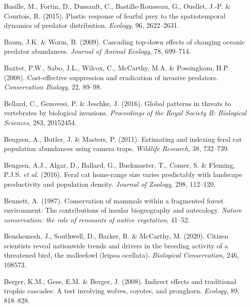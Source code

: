 \documentclass[11pt,a4paper,titlepage,twoside,openright]{style/unimelbthesis}
\begin{document}
\begin{mainmatter}
\leavevmode\hypertarget{ref-basille2015plastic}{}%
Basille, M., Fortin, D., Dussault, C., Bastille-Rousseau, G., Ouellet, J.-P. \& Courtois, R. (2015). Plastic response of fearful prey to the spatiotemporal dynamics of predator distribution. \emph{Ecology}, 96, 2622--2631.

\leavevmode\hypertarget{ref-baum2009cascading}{}%
Baum, J.K. \& Worm, B. (2009). Cascading top-down effects of changing oceanic predator abundances. \emph{Journal of Animal Ecology}, 78, 699--714.

\leavevmode\hypertarget{ref-baxter2008cost}{}%
Baxter, P.W., Sabo, J.L., Wilcox, C., McCarthy, M.A. \& Possingham, H.P. (2008). Cost-effective suppression and eradication of invasive predators. \emph{Conservation Biology}, 22, 89--98.

\leavevmode\hypertarget{ref-bellard2016global}{}%
Bellard, C., Genovesi, P. \& Jeschke, J. (2016). Global patterns in threats to vertebrates by biological invasions. \emph{Proceedings of the Royal Society B: Biological Sciences}, 283, 20152454.

\leavevmode\hypertarget{ref-bengsen2011estimating}{}%
Bengsen, A., Butler, J. \& Masters, P. (2011). Estimating and indexing feral cat population abundances using camera traps. \emph{Wildlife Research}, 38, 732--739.

\leavevmode\hypertarget{ref-bengsen2016feral}{}%
Bengsen, A.J., Algar, D., Ballard, G., Buckmaster, T., Comer, S. \& Fleming, P.J.S. \emph{et al.} (2016). Feral cat home-range size varies predictably with landscape productivity and population density. \emph{Journal of Zoology}, 298, 112--120.

\leavevmode\hypertarget{ref-bennett1987conservation}{}%
Bennett, A. (1987). Conservation of mammals within a fragmented forest environment: The contributions of insular biogeography and autecology. \emph{Nature conservation: the role of remnants of native vegetation}, 41--52.

\leavevmode\hypertarget{ref-benshemesh2020citizen}{}%
Benshemesh, J., Southwell, D., Barker, R. \& McCarthy, M. (2020). Citizen scientists reveal nationwide trends and drivers in the breeding activity of a threatened bird, the malleefowl (leipoa ocellata). \emph{Biological Conservation}, 246, 108573.

\leavevmode\hypertarget{ref-berger2008indirect}{}%
Berger, K.M., Gese, E.M. \& Berger, J. (2008). Indirect effects and traditional trophic cascades: A test involving wolves, coyotes, and pronghorn. \emph{Ecology}, 89, 818--828.


\end{mainmatter}
\end{document}
